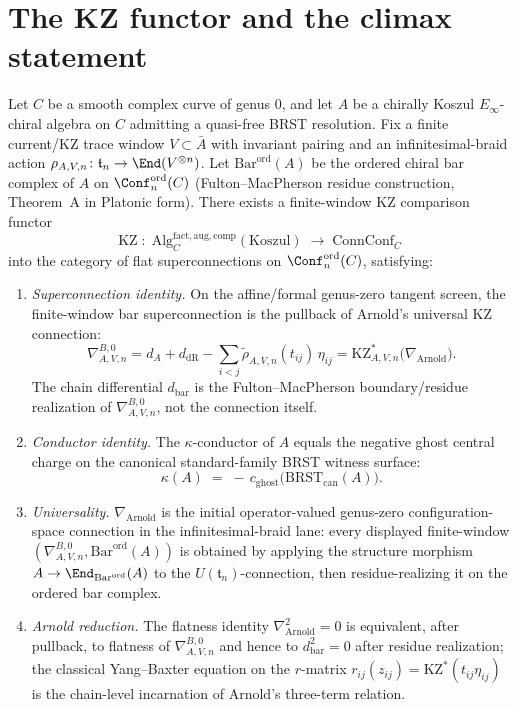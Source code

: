 \section{The KZ functor and the climax statement}
\label{sec:climax-kz-functor}

\begin{theorem}
\label{thm:climax-genus-zero}
\ClaimStatusConditional
Let $C$ be a smooth complex curve of genus $0$, and let $A$ be a
chirally Koszul $E_\infty$-chiral algebra on $C$ admitting a quasi-free
BRST resolution. Fix a finite current/KZ trace window
\(V\subset\bar A\) with invariant pairing and an infinitesimal-braid
action
\(\rho_{A,V,n}\colon\mathfrak t_n\to\End(V^{\otimes n})\). Let
\(\mathrm{Bar}^{\mathrm{ord}}(A)\) be the ordered chiral bar complex of
\(A\) on \(\Conf_n^{\mathrm{ord}}(C)\)
\textup{(}Fulton--MacPherson residue construction, Theorem~A in
Platonic form\textup{).} There exists a finite-window KZ comparison
functor
\[
 \mathrm{KZ} \;\colon\; \mathrm{Alg}^{\mathrm{fact, aug, comp}}_C(\text{Koszul})
 \;\longrightarrow\; \mathrm{ConnConf}_C
\]
into the category of flat superconnections on
\(\Conf_n^{\mathrm{ord}}(C)\),
satisfying:
\begin{enumerate}
 \item \emph{Superconnection identity.} On the affine/formal
 genus-zero tangent screen, the finite-window bar superconnection is
 the pullback of Arnold's universal KZ connection:
 \[
 \nabla^{B,0}_{A,V,n}
 =d_A+d_{\mathrm{dR}}
 -\sum_{i<j}\widetilde\rho_{A,V,n}(t_{ij})\,\eta_{ij}
 =\mathrm{KZ}_{A,V,n}^*
 \bigl(\nabla_{\mathrm{Arnold}}\bigr).
 \]
 The chain differential \(d_{\mathrm{bar}}\) is the
 Fulton--MacPherson boundary/residue realization of
 \(\nabla^{B,0}_{A,V,n}\), not the connection itself.
 \item \emph{Conductor identity.} The $\kappa$-conductor of $A$ equals
 the negative ghost central charge on the canonical standard-family
 BRST witness surface:
 \[
 \kappa(A) \;=\; -\, c_{\mathrm{ghost}}\bigl(\mathrm{BRST}_{\mathrm{can}}(A)\bigr).
 \]
 \item \emph{Universality.} $\nabla_{\mathrm{Arnold}}$ is the initial
 operator-valued genus-zero configuration-space connection in the
 infinitesimal-braid lane: every displayed finite-window
 \((\nabla^{B,0}_{A,V,n}, \mathrm{Bar}^{\mathrm{ord}}(A))\) is obtained
 by applying the structure morphism
 \(A \to \End_{\mathrm{Bar}^{\mathrm{ord}}}(A)\) to the
 \(U(\mathfrak t_n)\)-connection, then residue-realizing it on the
 ordered bar complex.
 \item \emph{Arnold reduction.} The flatness identity
 $\nabla_{\mathrm{Arnold}}^2 = 0$ is equivalent, after pullback, to
 flatness of \(\nabla^{B,0}_{A,V,n}\) and hence to
 \(d_{\mathrm{bar}}^2 = 0\) after residue realization; the
 classical Yang--Baxter equation on the $r$-matrix
 \(r_{ij}(z_{ij})=\mathrm{KZ}^{*}(t_{ij}\eta_{ij})\) is the chain-level
 incarnation of Arnold's three-term relation.
\end{enumerate}
\end{theorem}

